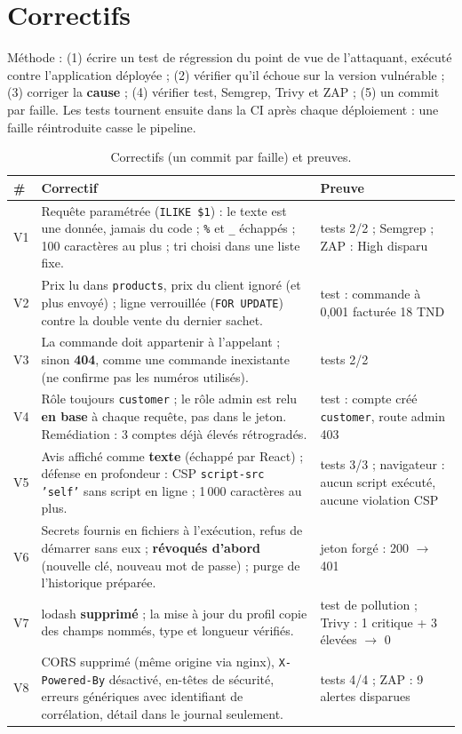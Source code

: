 \documentclass[11pt,a4paper]{article}
\newcommand{\code}[1]{\texttt{\small #1}}
\begin{document}
\section{Correctifs}

Méthode : (1) écrire un test de régression du point de vue de l'attaquant, exécuté contre l'application
déployée ; (2) vérifier qu'il échoue sur la version vulnérable ; (3) corriger la \textbf{cause} ; (4)
vérifier test, Semgrep, Trivy et ZAP ; (5) un commit par faille. Les tests tournent ensuite dans la CI
après chaque déploiement : une faille réintroduite casse le pipeline.

\begin{table}[H]
\small
\begin{tabularx}{\linewidth}{@{}L{0.6cm}YL{4.3cm}@{}}
\toprule
\textbf{\#} & \textbf{Correctif} & \textbf{Preuve} \\
\midrule
V1 & Requête paramétrée (\code{ILIKE \$1}) : le texte est une donnée, jamais du code ; \code{\%} et \code{\_} échappés ; 100 caractères au plus ; tri choisi dans une liste fixe. & tests 2/2 ; Semgrep ; ZAP : High disparu \\
V2 & Prix lu dans \code{products}, prix du client ignoré (et plus envoyé) ; ligne verrouillée (\code{FOR UPDATE}) contre la double vente du dernier sachet. & test : commande à 0,001 facturée 18 TND \\
V3 & La commande doit appartenir à l'appelant ; sinon \textbf{404}, comme une commande inexistante (ne confirme pas les numéros utilisés). & tests 2/2 \\
V4 & Rôle toujours \code{customer} ; le rôle admin est relu \textbf{en base} à chaque requête, pas dans le jeton. Remédiation : 3 comptes déjà élevés rétrogradés. & test : compte créé \code{customer}, route admin 403 \\
V5 & Avis affiché comme \textbf{texte} (échappé par React) ; défense en profondeur : CSP \code{script-src 'self'} sans script en ligne ; 1\,000 caractères au plus. & tests 3/3 ; navigateur : aucun script exécuté, aucune violation CSP \\
V6 & Secrets fournis en fichiers à l'exécution, refus de démarrer sans eux ; \textbf{révoqués d'abord} (nouvelle clé, nouveau mot de passe) ; purge de l'historique préparée. & jeton forgé : 200 $\rightarrow$ 401 \\
V7 & lodash \textbf{supprimé} ; la mise à jour du profil copie des champs nommés, type et longueur vérifiés. & test de pollution ; Trivy : 1 critique + 3 élevées $\rightarrow$ 0 \\
V8 & CORS supprimé (même origine via nginx), \code{X-Powered-By} désactivé, en-têtes de sécurité, erreurs génériques avec identifiant de corrélation, détail dans le journal seulement. & tests 4/4 ; ZAP : 9 alertes disparues \\
\bottomrule
\end{tabularx}
\caption{Correctifs (un commit par faille) et preuves.}
\end{table}
\end{document}
